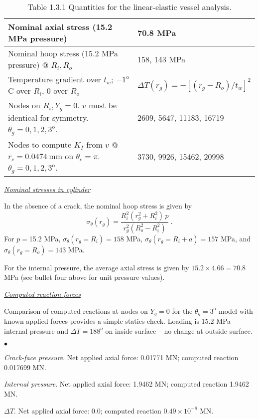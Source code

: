 \documentclass[11pt]{report}
\numberwithin{equation}{section}
\newcommand{\degree } {\mathrm{o} }  %
\newcommand{\ul} {\underline}
\newcommand{\ti}{\emph}
\newcommand{\nid}{\noindent}
\newcommand{\squishlist}{
 \begin{list}{$\bullet$}
  { \setlength{\itemsep}{0pt}
     \setlength{\parsep}{3pt}
     \setlength{\topsep}{3pt}
     \setlength{\partopsep}{0pt}
     \setlength{\leftmargin}{1.5em}
     \setlength{\labelwidth}{1em}
     \setlength{\labelsep}{0.5em} } }
\newcommand{\squishend}{
  \end{list}  }
\begin{document}
\begin{table}[htb]
{\begin{tabular}{ | p{4in} | p{2in} | }
Nominal axial stress (15.2 MPa pressure) & 70.8 MPa \\ \hline 
Nominal hoop stress (15.2 MPa pressure) @ $R_i, R_o$ & 158, 143 MPa \\ \hline 
Temperature gradient over $t_w$; $-1^\degree$C over $R_i$, 0 over $R_o$& $\Delta T(r_g) = -\left [ (r_g-R_o)/t_w\right ]^2$  \\ \hline 
Nodes on $R_i, Y_g=0$. $v$ must be identical
  for symmetry. $\theta_g=0, 1, 2, 3^\degree$. & 2609, 5647, 11183, 16719  \\ \hline
Nodes to compute $K_I$ from $v$ @ $r_c=0.0474\ \mathrm{mm}$ on $\theta_c=\pi$.
    $\theta_g=0, 1, 2, 3^\degree$.  & 3730, 9926, 15462, 20998 \\ \hline
\end{tabular}}
\normalsize
	
%
\caption{Table 1.3.1 
Quantities for the linear-elastic vessel analysis.}
\label{table:linear-vessel}
\end{table}

\nid \ti{\ul{Nominal stresses in cylinder} }

\nid In the absence of a crack, the nominal hoop stress is given by
%
\begin{equation}\label{E:nomstress}
\sigma_\theta (r_g) = \frac{R_i^2 (r_g^2+R_i^2 )\, p }{r_g^2 (R_o^2-R_i^2)}\ .
\end{equation}
%
\nid For $p=$15.2 MPa, $\sigma_\theta (r_g=R_i) = 158$ MPa, $\sigma_\theta (r_g=R_i+a) = 157$ MPa,
and $\sigma_\theta (r_g=R_o) = 143$ MPa. 

For the internal pressure, the average axial stress is given by $15.2 \times 4.66=70.8$ MPa (see bullet four
above for unit pressure values).

\nid \ti{\ul{Computed reaction forces} }

\nid Comparison of computed reactions at nodes on $Y_g=0$ for the $\theta_g=3^\degree$
model with known applied forces provides a simple statics check. Loading is 15.2 MPa internal pressure
and $\Delta T=188^o$ on inside surface -- no change at outside surface.
\squishlist
\item \ti{Crack-face pressure}. Net applied axial force: 0.01771 MN; computed reaction 0.017699 MN. 
\item \ti{Internal pressure}. Net applied axial force: 1.9462 MN; computed reaction 1.9462 MN. 
\item $\Delta T$. Net applied axial force: 0.0; computed reaction $0.49 \times 10^{-8}$ MN. 
\squishend
\end{document}
